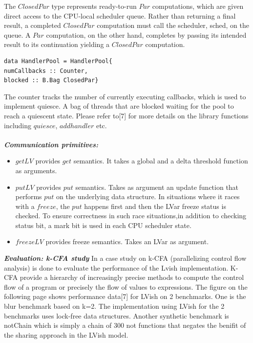 \documentclass[twocolumn]{article}
\begin{document}
The $ClosedPar$ type represents ready-to-run $Par$ computations, which are given direct access to the CPU-local scheduler queue. Rather than returning a final result, a completed $ClosedPar$ computation must call the scheduler, sched, on the queue. A $Par$
computation, on the other hand, completes by passing its intended result to its continuation yielding a $ClosedPar$ computation.
\begin{verbatim}
data HandlerPool = HandlerPool{
numCallbacks :: Counter,
blocked :: B.Bag ClosedPar}
\end{verbatim}
The counter tracks the number of currently executing callbacks, which is used to implement quiesce. A bag of threads that are blocked waiting for the pool to reach a quiescent state. Please refer to[7] for more details on the library functions
including $quiesce$, $addhandler$ etc.\\ \\
\textbf{\textit{Communication primitives:}}
\begin{itemize}
\item $getLV$ provides $get$ semantics. It takes a global and a delta threshold function as arguments.
\item $putLV$ provides $put$ semantics. Takes as argument an update function that performs $put$ on the underlying data structure. In situations where it races with a $freeze$, the $put$ happens first and then the LVar freeze status is checked.
To ensure correctness in such race situations,in addition to checking status bit, a mark bit is used in each CPU scheduler state.
\item $freezeLV$ provides freeze semantics. Takes an LVar as argument.
\end{itemize}
\textbf{\textit{Evaluation: k-CFA study}} In \cite{lkuper2} a case study on k-CFA (parallelizing control flow analysis) is done to evaluate the performance of the Lvish implementation. K-CFA provide a hierarchy of increasingly precise methods to compute the control 
flow of a program or precisely the flow of values to expressions. The figure on the following page shows performance data[7] for LVish on 2 benchmarks. One is the blur benchmark based on k=2. The implementation using LVish for the 2 benchmarks uses lock-free data structures. Another synthetic benchmark is notChain which is simply a chain of 300 not functions that negates the benifit of the sharing approach in the LVish model.\\ \\
\end{document}
